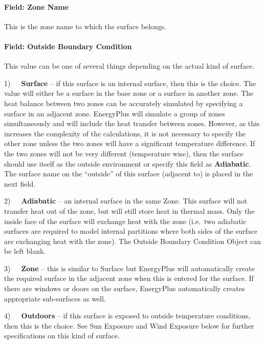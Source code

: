 \paragraph{Field: Zone Name}\label{field-zone-name-12-000}

This is the zone name to which the surface belongs.

\paragraph{Field: Outside Boundary Condition}\label{field-outside-boundary-condition-2}

This value can be one of several things depending on the actual kind of surface.

1)~~~\textbf{Surface} -- if this surface is an internal surface, then this is the choice. The value will either be a surface in the base zone or a surface in another zone. The heat balance between two zones can be accurately simulated by specifying a surface in an adjacent zone. EnergyPlus will simulate a group of zones simultaneously and will include the heat transfer between zones. However, as this increases the complexity of the calculations, it is not necessary to specify the other zone unless the two zones will have a significant temperature difference. If the two zones will not be very different (temperature wise), then the surface should use itself as the outside environment or specify this field as \textbf{Adiabatic}. The surface name on the ``outside'' of this surface (adjacent to) is placed in the next field.

2)~~~\textbf{Adiabatic} -- an internal surface in the same Zone. This surface will not transfer heat out of the zone, but will still store heat in thermal mass. Only the inside face of the surface will exchange heat with the zone (i.e.~two adiabatic surfaces are required to model internal partitions where both sides of the surface are exchanging heat with the zone). The Outside Boundary Condition Object can be left blank.

3)~~~\textbf{Zone} -- this is similar to Surface but EnergyPlus will automatically create the required surface in the adjacent zone when this is entered for the surface. If there are windows or doors on the surface, EnergyPlus automatically creates appropriate sub-surfaces as well.

4)~~~\textbf{Outdoors} -- if this surface is exposed to outside temperature conditions, then this is the choice. See Sun Exposure and Wind Exposure below for further specifications on this kind of surface.

